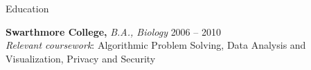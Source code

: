 \documentclass{resume} %
\begin{document}

\begin{rSection}{Education}
\vspace{0.3em}


{\bf Swarthmore College, }{\em B.A., Biology } \hfill 2006 -- 2010 \\
{\em Relevant coursework}: Algorithmic Problem Solving, Data Analysis and Visualization, Privacy and Security
\end{rSection}







\end{document}
